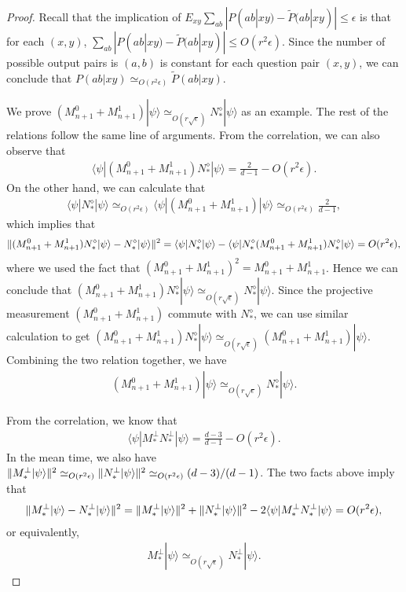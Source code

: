 \documentclass[11pt,letterpaper]{article}
\newcommand{\ket}[1]{|#1\rangle}
\newcommand{\bra}[1]{\langle#1|}
\DeclarePairedDelimiter{\norm}{\lVert}{\rVert}
\newcommand{\1}{\mathbb{1}}
\newcommand{\pr}[2]{P(#1|#2)}
\newcommand{\tpr}[2]{\tilde{P}(#1|#2)}
\newcommand{\ep}{\epsilon}
\newcommand{\se}{\sqrt{\epsilon}}
\newcommand{\appd}[1]{\simeq_{#1}}
\theoremstyle{definition}
\begin{document}
\begin{proof} 

Recall that the implication of $E_{xy} \sum_{ab} |\pr{ab}{xy} - \tpr{ab}{xy}| \leq \ep$ is that 
for each $(x,y)$, $\sum_{ab} |\pr{ab}{xy} - \tpr{ab}{xy}| \leq O(r^2 \epsilon)$. Since 
the number of possible output pairs is $(a,b)$ is constant for each question pair $(x,y)$, 
we can conclude that $\pr{ab}{xy} \appd{O(r^2\ep)} \tpr{ab}{xy}$. 

We prove $(M_{n+1}^0+M_{n+1}^1)\ket{\psi} \appd{O(r\se)} N_\ast^\diamond \ket{\psi}$ as an example.
The rest of the relations follow the same line of arguments.
From the correlation, we can also observe that
\begin{align}
 \bra{\psi} (M_{n+1}^0+M_{n+1}^1)N_\ast^\diamond \ket{\psi} = \frac{2}{d-1} - O(r^2 \epsilon).
\end{align}
On the other hand, we can calculate that 
\begin{align}
	\bra{\psi} N_\ast^\diamond \ket{\psi} \appd{O(r^2\epsilon)} 
 \bra{\psi}(M_{n+1}^0+M_{n+1}^1)\ket{\psi} \appd{O(r^2\epsilon)} \frac{2}{d-1},
\end{align}
which implies that 
\begin{align}
	\norm{(M_{n+1}^0 + M_{n+1}^1)N_\ast^\diamond \ket{\psi} - N_\ast^\diamond\ket{\psi}}^2 
	= \bra{\psi} N_\ast^\diamond \ket{\psi} - \bra{\psi}N_\ast^\diamond(M_{n+1}^0 + M_{n+1}^1)N_\ast^\diamond \ket{\psi}
	= O(r^2 \epsilon),
\end{align}
where we used the fact that $(M_{n+1}^0 + M_{n+1}^1)^2 = M_{n+1}^0 + M_{n+1}^1$.
Hence we can conclude that $(M_{n+1}^0 + M_{n+1}^1)N_\ast^\diamond \ket{\psi} \appd{O(r\se)} N_\ast^\diamond\ket{\psi}$.
Since the projective measurement $(M_{n+1}^0+M_{n+1}^1)$ commute with $N_\ast^\diamond$, we can use similar calculation to get
$(M_{n+1}^0 + M_{n+1}^1)N_\ast^\diamond \ket{\psi} \appd{O(r\se)} (M_{n+1}^0 + M_{n+1}^1)\ket{\psi}$.
Combining the two relation together, we have
\begin{align}
	(M_{n+1}^0 + M_{n+1}^1) \ket{\psi} \appd{O(r\se)} N_\ast^\diamond \ket{\psi}.
\end{align}

From the correlation, we know that 
\begin{align}
	\bra{\psi} M_\ast^\perp N_\ast^\perp \ket{\psi} = \frac{d-3}{d-1} - O(r^2 \ep).
\end{align}
In the mean time, we also have 
$\norm{M_\ast^\perp \ket{\psi}}^2 \appd{O(r^2\ep)} \norm{N_\ast^\perp\ket{\psi}}^2 \appd{O(r^2\ep)} (d-3)/(d-1)$.
The two facts above imply that 
\begin{align}
	\norm{M_\ast^\perp \ket{\psi} - N_\ast^\perp \ket{\psi}}^2 = \norm{M_\ast^\perp \ket{\psi}}^2 + \norm{N_\ast^\perp \ket{\psi}}^2
	- 2 \bra{\psi} M_\ast^\perp N_\ast^\perp \ket{\psi}  = O(r^2 \ep),
\end{align}
or equivalently,
\begin{align}
	M_\ast^\perp \ket{\psi} \appd{O(r\se)} N_\ast^\perp \ket{\psi}.
\end{align}
\end{proof}
\end{document}
